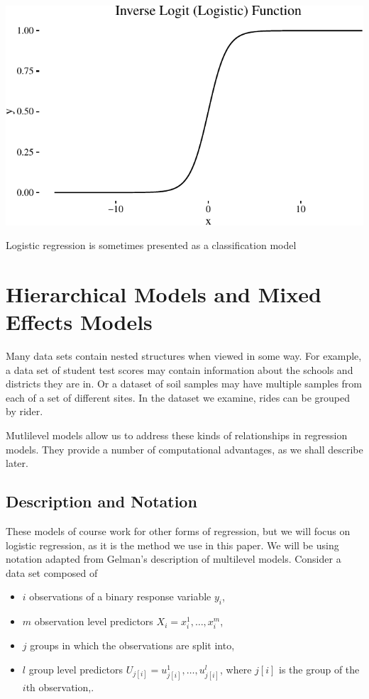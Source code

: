 \documentclass[12pt,twoside]{reedthesis}
\providecommand{\tightlist}{%
  \setlength{\itemsep}{0pt}\setlength{\parskip}{0pt}}
\begin{document}
  \begin{center}\includegraphics{thesis_files/figure-latex/unnamed-chunk-2-1} \end{center}
  
  Logistic regression is sometimes presented as a classification model
  
  \section{Hierarchical Models and Mixed Effects Models}\label{h-models}
  
  Many data sets contain nested structures when viewed in some way. For
  example, a data set of student test scores may contain information about
  the schools and districts they are in. Or a dataset of soil samples may
  have multiple samples from each of a set of different sites. In the
  dataset we examine, rides can be grouped by rider.
  
  Mutlilevel models allow us to address these kinds of relationships in
  regression models. They provide a number of computational advantages, as
  we shall describe later.
  
  \subsection{Description and Notation}\label{description-and-notation}
  
  These models of course work for other forms of regression, but we will
  focus on logistic regression, as it is the method we use in this paper.
  We will be using notation adapted from Gelman's description of
  multilevel models. Consider a data set composed of
  
  \begin{itemize}
  \tightlist
  \item
    \(i\) observations of a binary response variable \(y_i\),
  \item
    \(m\) observation level predictors \(X_i = x_i^1, \ldots, x_i^m\),
  \item
    \(j\) groups in which the observations are split into,
  \item
    \(l\) group level predictors
    \(U_{j[i]} = u_{j[i]}^1, \ldots, u_{j[i]}^l\), where \(j[i]\) is the
    group of the \(i\)th observation,.
  \end{itemize}
  
\end{document}
